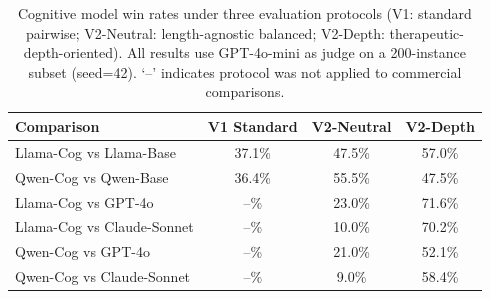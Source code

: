\begin{table}[t]
\centering\small
\begin{tabular}{lccc}
\toprule
Comparison & V1 Standard & V2-Neutral & V2-Depth \\
\midrule
Llama-Cog vs Llama-Base & 37.1\% & 47.5\% & 57.0\% \\
Qwen-Cog vs Qwen-Base & 36.4\% & 55.5\% & 47.5\% \\
Llama-Cog vs GPT-4o & --\% & 23.0\% & 71.6\% \\
Llama-Cog vs Claude-Sonnet & --\% & 10.0\% & 70.2\% \\
Qwen-Cog vs GPT-4o & --\% & 21.0\% & 52.1\% \\
Qwen-Cog vs Claude-Sonnet & --\% & 9.0\% & 58.4\% \\
\bottomrule
\end{tabular}
\caption{Cognitive model win rates under three evaluation protocols (V1: standard pairwise; V2-Neutral: length-agnostic balanced; V2-Depth: therapeutic-depth-oriented). All results use GPT-4o-mini as judge on a 200-instance subset (seed=42). `--' indicates protocol was not applied to commercial comparisons.}
\label{tab:prompt_sensitivity}
\end{table}
